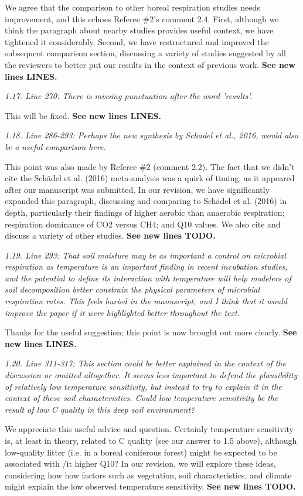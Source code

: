 \documentclass[11pt, oneside]{article}
\begin{document}
We agree that the comparison to other boreal respiration studies needs improvement, and this echoes Referee \#2's comment 2.4. First, although we think the paragraph about nearby studies provides useful context, we have tightened it considerably. Second, we have restructured and improved the subsequent comparison section, discussing a variety of studies suggested by all the reviewers to better put our results in the context of previous work. {\bf See new lines LINES.}

\medskip
{\it 1.17. Line 270: There is missing punctuation after the word 'results'. }

This will be fixed. {\bf See new lines LINES.}

\medskip
{\it 1.18. Line 286-293: Perhaps the new synthesis by Schadel et al., 2016, would also be a useful comparison here. }

This point was also made by Referee \#2 (comment 2.2). The fact that we didn't cite the Schädel et al. (2016) meta-analysis was a quirk of timing, as it appeared after our manuscript was submitted. In our revision, we have significantly expanded this paragraph, discussing and comparing to Schädel et al. (2016) in depth, particularly their findings of higher aerobic than anaerobic respiration; respiration dominance of CO2 versus CH4; and Q10 values. We also cite and discuss a variety of other studies. {\bf See new lines TODO.}

\medskip
{\it 1.19. Line 293: That soil moisture may be as important a control on microbial respiration as temperature is an important finding in recent incubation studies, and the potential to define its interaction with temperature will help modelers of soil decomposition better constrain the physical parameters of microbial respiration rates. This feels buried in the manuscript, and I think that it would improve the paper if it were highlighted better throughout the text. }

Thanks for the useful suggestion; this point is now brought out more clearly. {\bf See new lines LINES.}

\medskip
{\it 1.20. Line 311-317: This section could be better explained in the context of the discussion or omitted altogether. It seems less important to defend the plausibility of relatively low temperature sensitivity, but instead to try to explain it in the context of these soil characteristics. Could low temperature sensitivity be the result of low C quality in this deep soil environment? }

We appreciate this useful advice and question. Certainly temperature sensitivity is, at least in theory, related to C quality (see our answer to 1.5 above), although low-quality litter (i.e. in a boreal coniferous forest) might be expected to be associated with {/it higher} Q10? In our revision, we will explore these ideas, considering how how factors such as vegetation, soil characteristics, and climate might explain the low observed temperature sensitivity. {\bf See new lines TODO.}
\end{document}
